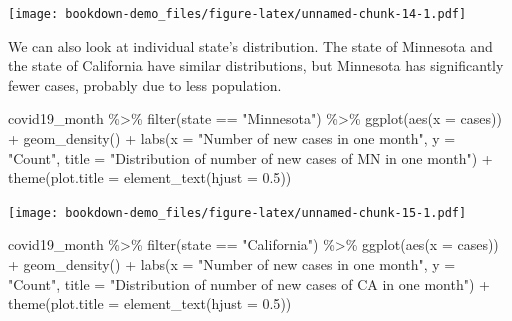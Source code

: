 \documentclass[
]{book}
\newenvironment{Shaded}{\begin{snugshade}}{\end{snugshade}}
\newcommand{\AttributeTok}[1]{\textcolor[rgb]{0.77,0.63,0.00}{#1}}
\newcommand{\FloatTok}[1]{\textcolor[rgb]{0.00,0.00,0.81}{#1}}
\newcommand{\FunctionTok}[1]{\textcolor[rgb]{0.00,0.00,0.00}{#1}}
\newcommand{\NormalTok}[1]{#1}
\newcommand{\SpecialCharTok}[1]{\textcolor[rgb]{0.00,0.00,0.00}{#1}}
\newcommand{\StringTok}[1]{\textcolor[rgb]{0.31,0.60,0.02}{#1}}
\begin{document}
\texttt{[image: bookdown-demo\_files/figure-latex/unnamed-chunk-14-1.pdf]}

We can also look at individual state's distribution. The state of Minnesota and the state of California have similar distributions, but Minnesota has significantly fewer cases, probably due to less population.

\begin{Shaded}
\begin{Highlighting}[]
\NormalTok{covid19\_month }\SpecialCharTok{\%\textgreater{}\%}
  \FunctionTok{filter}\NormalTok{(state }\SpecialCharTok{==} \StringTok{"Minnesota"}\NormalTok{) }\SpecialCharTok{\%\textgreater{}\%}
  \FunctionTok{ggplot}\NormalTok{(}\FunctionTok{aes}\NormalTok{(}\AttributeTok{x =}\NormalTok{ cases)) }\SpecialCharTok{+}
  \FunctionTok{geom\_density}\NormalTok{() }\SpecialCharTok{+} 
  \FunctionTok{labs}\NormalTok{(}\AttributeTok{x =} \StringTok{"Number of new cases in one month"}\NormalTok{, }\AttributeTok{y =} \StringTok{"Count"}\NormalTok{, }\AttributeTok{title =} \StringTok{"Distribution of number of new cases of MN in one month"}\NormalTok{) }\SpecialCharTok{+}
  \FunctionTok{theme}\NormalTok{(}\AttributeTok{plot.title =} \FunctionTok{element\_text}\NormalTok{(}\AttributeTok{hjust =} \FloatTok{0.5}\NormalTok{))}
\end{Highlighting}
\end{Shaded}

\texttt{[image: bookdown-demo\_files/figure-latex/unnamed-chunk-15-1.pdf]}

\begin{Shaded}
\begin{Highlighting}[]
\NormalTok{covid19\_month }\SpecialCharTok{\%\textgreater{}\%}
  \FunctionTok{filter}\NormalTok{(state }\SpecialCharTok{==} \StringTok{"California"}\NormalTok{) }\SpecialCharTok{\%\textgreater{}\%}
  \FunctionTok{ggplot}\NormalTok{(}\FunctionTok{aes}\NormalTok{(}\AttributeTok{x =}\NormalTok{ cases)) }\SpecialCharTok{+}
  \FunctionTok{geom\_density}\NormalTok{() }\SpecialCharTok{+}
  \FunctionTok{labs}\NormalTok{(}\AttributeTok{x =} \StringTok{"Number of new cases in one month"}\NormalTok{, }\AttributeTok{y =} \StringTok{"Count"}\NormalTok{, }\AttributeTok{title =} \StringTok{"Distribution of number of new cases of CA in one month"}\NormalTok{) }\SpecialCharTok{+}
  \FunctionTok{theme}\NormalTok{(}\AttributeTok{plot.title =} \FunctionTok{element\_text}\NormalTok{(}\AttributeTok{hjust =} \FloatTok{0.5}\NormalTok{))}
\end{Highlighting}
\end{Shaded}
\end{document}
